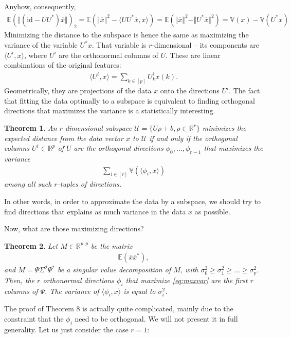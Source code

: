 \documentclass{article}
\newcommand{\erw}{\mathbb{E}} %
\newcommand{\id}{\mathrm{id}}
\newcommand{\sprod}[1]{\langle #1 \rangle}
\newcommand{\calU}{\mathcal{U}}
\newcommand{\R}{\mathbb{R}}
\newtheorem{theorem}{Theorem}
\newcommand{\norm}[1]{\Vert #1 \Vert}
\begin{document}
Anyhow, consequently,
\begin{align*}
    \erw(\norm{(\id-UU^*)\overline{x}})_2 = \erw(\norm{\overline{x}}^2 - \sprod{UU^*\overline{x},x})  = \erw(\norm{\overline{x}}^2- \norm{U^*\overline{x}}^2) = \mathbb{V}(x) - \mathbb{V}(U^*x)
\end{align*}
Minimizing the distance to the subspace is hence the same as maximizing the variance of the variable $U^*x$. That variable is $r$-dimensional -- its components are $\sprod{U^i,x}$, where $U^i$ are the orthonormal columns of $U$. These are linear combinations of the original features:
\begin{align*}
    \sprod{U^i,x} = \sum_{k\in [p]} U^i_kx(k).
\end{align*}
Geometrically, they are projections of the data $x$ onto the directions $U^i$.
The fact that fitting the data optimally to a subspace is equivalent to finding orthogonal directions that maximizes the variance is a statistically interesting.
\begin{theorem}
   An $r$-dimensional subspace $\calU = \{U\rho+b, \rho \in \R^r\}$ minimizes the expected distance from the data vector $x$ to $\calU$ if and only if the orthogonal columns $U^i \in \R^p$ of $U$ are the orthogonal directions $\phi_0, \dots, \phi_{r-1}$ that maximizes the variance
   \begin{align} \label{eq:maxvar}
       \sum_{i \in [r]} \mathbb{V}(\sprod{\phi_i,x})
   \end{align}
   among all such $r$-tuples of directions.
\end{theorem}
In other words, in order to approximate the data by a subspace, we should try to find directions that explains as much variance in the data $x$ as possible.

Now, what are those maximizing directions? 
\begin{theorem}\label{th:svd}
    Let $M \in \R^{p,p}$ be the matrix 
    \begin{align*}
        \mathbb{E}(\overline{x}\overline{x}^*),
    \end{align*}
    and $M= \Psi\Sigma^2 \Psi^*$ be a singular value decomposition of $M$, with $\sigma_0^2 \geq \sigma_1^2 \geq \dots \geq \sigma_p^2$. Then, the $r$ orthonormal directions $\phi_i$ that maximize \eqref{eq:maxvar} are the first $r$ columns of $\Psi$. The variance of $\sprod{\phi_i,x}$ is equal to $\sigma_i^2$.
\end{theorem}


The proof of Theorem 8 is actually quite complicated, mainly due to the constraint that the $\phi_i$ need to be orthogonal. We will not present it in full generality. Let us just consider the case $r=1$:
\end{document}

